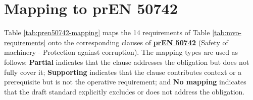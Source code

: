 \section{Mapping to prEN 50742}
\label{app:sec:mapping_pren50742}

Table \ref{tab:pren50742-mapping} maps the 14 requirements of Table \ref{tab:mvo-requirements} onto the corresponding clauses of \hyperref[subsec:pren_50742]{\textbf{prEN 50742}} (Safety of machinery - Protection against corruption). The mapping types are used as follows: \textbf{Partial} indicates that the clause addresses the obligation but does not fully cover it; \textbf{Supporting} indicates that the clause contributes context or a prerequisite but is not the operative requirement; and \textbf{No mapping} indicates that the draft standard explicitly excludes or does not address the obligation.
